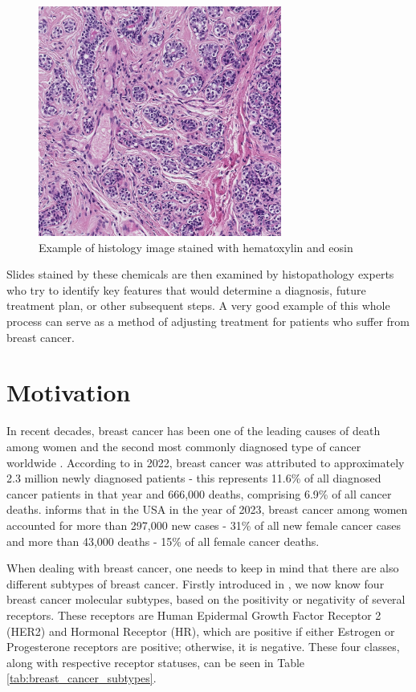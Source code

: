 \begin{figure}[h]
\begin{centering}
\includegraphics[width=8cm]{assets/images/histology_image_example.png}
\par\end{centering}
\caption{Example of histology image stained with hematoxylin and eosin \label{fig:h&e-image}}
\end{figure}

Slides stained by these chemicals are then examined by histopathology experts who try to identify key features that would determine a diagnosis, future treatment plan, or other subsequent steps. A very good example of this whole process can serve as a method of adjusting treatment for patients who suffer from breast cancer.

\section{Motivation}

In recent decades, breast cancer has been one of the leading causes of death among women and the second most commonly diagnosed type of cancer worldwide \cite{Bray2024, Siegel2023}. According to \cite{Bray2024} in 2022, breast cancer was attributed to approximately 2.3 million newly diagnosed patients - this represents 11.6\% of all diagnosed cancer patients in that year and 666,000 deaths, comprising 6.9\% of all cancer deaths. \cite{Siegel2023} informs that in the USA in the year of 2023, breast cancer among women accounted for more than 297,000 new cases - 31\% of all new female cancer cases and more than 43,000 deaths - 15\% of all female cancer deaths.

When dealing with breast cancer, one needs to keep in mind that there are also different subtypes of breast cancer. Firstly introduced in \cite{Perou2000}, we now know four breast cancer molecular subtypes, based on the positivity or negativity of several receptors. These receptors are Human Epidermal Growth Factor Receptor 2 (HER2) and Hormonal Receptor (HR), which are positive if either Estrogen or Progesterone receptors are positive; otherwise, it is negative. These four classes, along with respective receptor statuses, can be seen in Table \ref{tab:breast_cancer_subtypes}.

